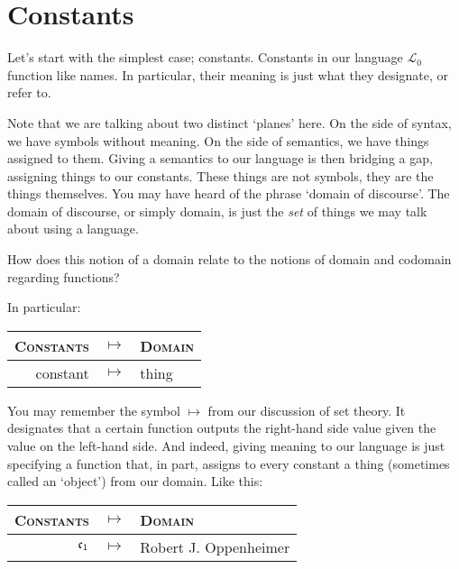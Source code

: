 \section{Constants}

Let's start with the simplest case; constants. Constants in our language $\mathcal{L}_0$ function like names. In particular, their meaning is just what they designate, or refer to. 

Note that we are talking about two distinct `planes' here. On the side of syntax, we have symbols without meaning. On the side of semantics, we have things assigned to them. Giving a semantics to our language is then bridging a gap, assigning things to our constants. These things are not symbols, they are the things themselves. You may have heard of the phrase `domain of discourse'. The domain of discourse, or simply domain, is just the \textit{set} of things we may talk about using a language.

\begin{exc}
How does this notion of a domain relate to the notions of domain and codomain regarding functions?
\end{exc}

 In particular:

\begin{center}
\begin{tabular}{rcl}
	\textsc{Constants} & $\mapsto$ & \textsc{Domain}\\\hline
	constant & $\mapsto$ & thing
\end{tabular}
\end{center}

You may remember the symbol $\mapsto$ from our discussion of set theory. It designates that a certain function outputs the right-hand side value given the value on the left-hand side. And indeed, giving meaning to our language is just specifying a function that, in part, assigns to every constant a thing (sometimes called an `object') from our domain. Like this:
\begin{center}
	\begin{tabular}{rcl}
		\textsc{Constants} & $\mapsto$ & \textsc{Domain}\\\hline
		$\mathfrak{c}_{1}$ & $\mapsto$ & Robert J. Oppenheimer
	\end{tabular}
\end{center}

